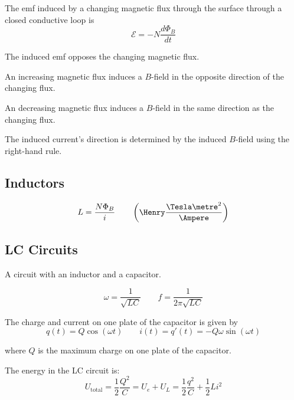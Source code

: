 \begin{namedlaw}
  The emf induced by a changing magnetic flux through the surface through a closed conductive loop is
  \[
    \mathcal{E} = - N \frac{d\Phi_B}{dt}
  \]
\end{namedlaw}

\begin{namedlaw}
  The induced emf opposes the changing magnetic flux.
\end{namedlaw}

\begin{theorem}
  An increasing magnetic flux induces a $B$-field in the opposite direction of the changing flux.

  An decreasing magnetic flux induces a $B$-field in the same direction as the changing flux.

  The induced current's direction is determined by the induced $B$-field using the right-hand rule.
\end{theorem}

\subsection{Inductors}

\begin{definition}[Inductance]
  \[
    L = \frac{N \Phi_B}{i} \qquad \left( \Henry \frac{\Tesla \metre^2}{\Ampere} \right)
  \]
\end{definition}


\begin{theorem}
  
\end{theorem}

\subsection{LC Circuits}

\begin{definition}[LC circuit]
  A circuit with an inductor and a capacitor.
\end{definition}

\begin{theorem}
  \[
    \omega = \frac{1}{\sqrt{LC}} \qquad f = \frac{1}{2\pi \sqrt{LC}}
  \]

  The charge and current on one plate of the capacitor is given by
  \[
    q(t) = Q \cos(\omega t) \qquad i(t) = q'(t) = -Q \omega \sin(\omega t)
  \]

  where $Q$ is the maximum charge on one plate of the capacitor.

  The energy in the LC circuit is:
  \[
    U_{\text{total}} = \frac{1}{2} \frac{Q^2}{C} = U_e + U_L = \frac{1}{2} \frac{q^2}{C} + \frac{1}{2} Li^2
  \]
\end{theorem}
